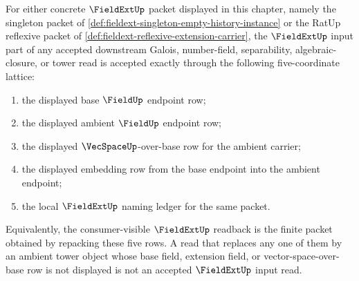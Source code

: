\begin{theorem}
\label{thm:fieldext-downstream-dependency-lattice-exactness}
For either concrete $\FieldExtUp$ packet displayed in this chapter, namely the
singleton packet of
\autoref{def:fieldext-singleton-empty-history-instance} or the RatUp reflexive
packet of \autoref{def:fieldext-reflexive-extension-carrier}, the
$\FieldExtUp$ input part of any accepted downstream Galois, number-field,
separability, algebraic-closure, or tower read is accepted exactly through the
following five-coordinate lattice:
\begin{enumerate}
  \item the displayed base $\FieldUp$ endpoint row;
  \item the displayed ambient $\FieldUp$ endpoint row;
  \item the displayed $\VecSpaceUp$-over-base row for the ambient carrier;
  \item the displayed embedding row from the base endpoint into the ambient endpoint;
  \item the local $\FieldExtUp$ naming ledger for the same packet.
\end{enumerate}
Equivalently, the consumer-visible $\FieldExtUp$ readback is the finite packet
obtained by repacking these five rows. A read that replaces any one of them by
an ambient tower object whose base field, extension field, or
vector-space-over-base row is not displayed is not an accepted $\FieldExtUp$
input read.
\end{theorem}
